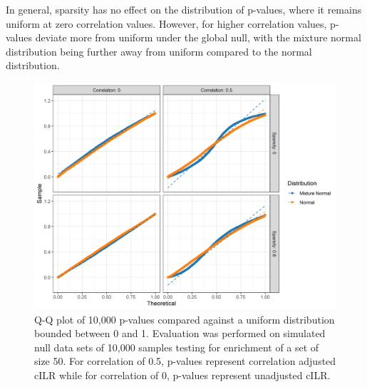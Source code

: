\documentclass{article}
\begin{document}
In general, sparsity has no effect on the distribution of p-values, where it remains uniform at zero correlation values. However, for higher correlation values, p-values deviate more from uniform under the global null, with the mixture normal distribution being further away from uniform compared to the normal distribution. 

\begin{figure}[!ht]
    \centering
    \includegraphics[width=\textwidth]{figures/pval_distr.png}
    \caption{Q-Q plot of 10,000 p-values compared against a uniform distribution bounded between 0 and 1. Evaluation was performed on simulated null data sets of 10,000 samples testing for enrichment of a set of size 50. For correlation of 0.5, p-values represent correlation adjusted cILR while for correlation of 0, p-values represent unadjusted cILR.}
    \label{fig:s2}
\end{figure}

\newpage
{}

\end{document}
